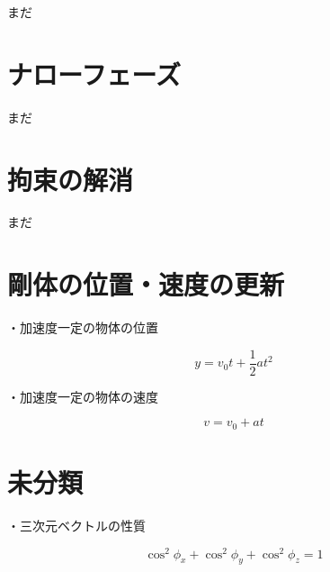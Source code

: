 \documentclass[11pt,aj4]{jarticle}
\begin{document}
まだ

\section{ナローフェーズ}

まだ

\section{拘束の解消}

まだ

\section{剛体の位置・速度の更新}

・加速度一定の物体の位置

\[
    y
    = v_0 t + \frac{1}{2} a t^2
\]

・加速度一定の物体の速度

\[
    v
    = v_0 + a t
\]

\section{未分類}

    ・三次元ベクトルの性質

    \[
        \cos^2\phi_x + \cos^2\phi_y + \cos^2\phi_z = 1
    \]
\end{document}
